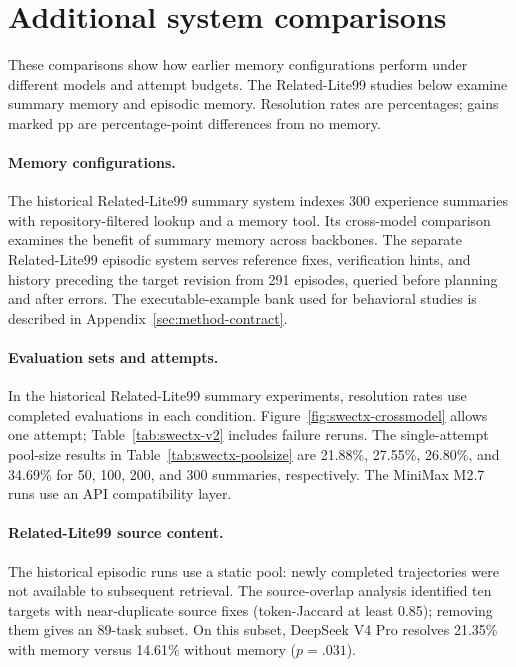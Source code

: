 \section{Additional system comparisons}
\label{sec:historical}
These comparisons show how earlier memory configurations perform under
different models and attempt budgets. The Related-Lite99 studies below
examine summary memory and episodic memory.
Resolution rates are percentages; gains marked pp are percentage-point
differences from no memory.

\paragraph{Memory configurations.}
The historical Related-Lite99 summary system indexes 300 experience summaries with
repository-filtered lookup and a memory tool. Its cross-model comparison
examines the benefit of summary memory across backbones. The separate
Related-Lite99 episodic system serves reference fixes, verification hints,
and history preceding the target revision from 291 episodes, queried before
planning and after errors.
The executable-example bank used for behavioral studies is described in
Appendix~\ref{sec:method-contract}.

\paragraph{Evaluation sets and attempts.}
In the historical Related-Lite99 summary experiments, resolution rates use completed
evaluations in each condition. Figure~\ref{fig:swectx-crossmodel} allows
one attempt; Table~\ref{tab:swectx-v2} includes failure reruns.
The single-attempt pool-size results in Table~\ref{tab:swectx-poolsize}
are 21.88\%, 27.55\%, 26.80\%, and 34.69\% for 50, 100, 200, and
300 summaries, respectively.
The MiniMax M2.7 runs use an API compatibility layer.

\paragraph{Related-Lite99 source content.}
The historical episodic runs use a static pool: newly completed trajectories
were not available to subsequent retrieval. The source-overlap analysis
identified ten targets with near-duplicate source fixes (token-Jaccard at least
0.85); removing them gives an 89-task subset. On this subset, DeepSeek V4 Pro
resolves 21.35\% with memory versus 14.61\% without memory ($p=.031$).

